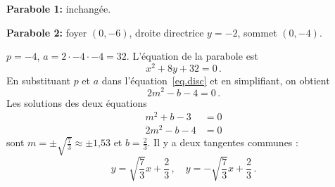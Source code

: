 \begin{example}\mbox{}

\noindent\textbf{Parabole 1:}
inchangée.

\noindent\textbf{Parabole 2:} foyer $(0,-6)$, droite directrice $y=-2$, sommet $(0,-4)$.

\noindent{}$p=-4$, $a=2\cdot -4\cdot -4=32$. L'équation de la parabole est 
\[
x^2+8y +32=0\,.
\]
En substituant $p$ et $a$ dans l'équation~\ref{eq.disc} et en simplifiant, on obtient 
\[
2m^2-b-4=0\,.
\]
Les solutions des deux équations 
\begin{align*}
m^2+b-3&=0\\
2m^2-b-4&=0
\end{align*}
sont $m=\pm\sqrt{\displaystyle\frac{7}{3}}\approx \pm \mbox{1,53}$ et $b=\displaystyle\frac{2}{3}$. Il y a deux tangentes communes :
\[
y=\sqrt{\frac{7}{3}}x+\frac{2}{3}\,,\quad y=-\sqrt{\frac{7}{3}}x+\frac{2}{3}\,.
\]
\end{example}


